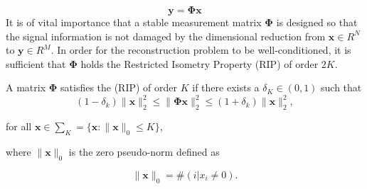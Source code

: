 %
\begin{equation}
  \label{eq:10}
\boldsymbol{y} =\boldsymbol{\Phi x}
\end{equation}
It is of vital importance that a stable measurement matrix $\boldsymbol{\Phi}$ is designed so that the signal information is not damaged by the dimensional reduction from $\boldsymbol{x} \in R^N$ to $\boldsymbol{y} \in R^M$. In order for the reconstruction problem to be well-conditioned, it is sufficient that ${\boldsymbol{\Phi}}$ holds the Restricted Isometry Property (RIP) \cite{Donoho2006} of order $2K$. 

\begin{mydef}
 A matrix $\boldsymbol{\Phi}$ satisfies the (RIP) of order $K$ if there exists a $\delta_K  \in (0,1)$ such that 
\begin{equation*}
  \label{eq:40}
  (1 - \delta_k)\|\boldsymbol{x}\|^2_2 \leq\|\boldsymbol{\Phi} \boldsymbol{x}\|^2_2 \leq (1 + \delta_k)\|\boldsymbol{x}\|^2_2,
\end{equation*}

for all $\boldsymbol{x} \in \sum_K = \{\boldsymbol{x}:\|\boldsymbol{x}\|_0 \leq K\} $, \newline

where $\|\boldsymbol{x}\|_0$ is the zero pseudo-norm defined as

\begin{equation*}
\|\boldsymbol{x}\|_0 = \#(i|x_i \neq 0). 
\end{equation*}
 
\end{mydef}

%

